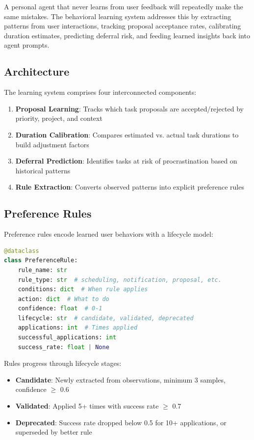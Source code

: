 \documentclass[11pt,a4paper]{article}
\begin{document}
A personal agent that never learns from user feedback will repeatedly make the same mistakes. The behavioral learning system addresses this by extracting patterns from user interactions, tracking proposal acceptance rates, calibrating duration estimates, predicting deferral risk, and feeding learned insights back into agent prompts.

\subsection{Architecture}

The learning system comprises four interconnected components:

\begin{enumerate}
    \item \textbf{Proposal Learning}: Tracks which task proposals are accepted/rejected by priority, project, and context
    \item \textbf{Duration Calibration}: Compares estimated vs. actual task durations to build adjustment factors
    \item \textbf{Deferral Prediction}: Identifies tasks at risk of procrastination based on historical patterns
    \item \textbf{Rule Extraction}: Converts observed patterns into explicit preference rules
\end{enumerate}

\subsection{Preference Rules}

Preference rules encode learned user behaviors with a lifecycle model:

\begin{lstlisting}[language=Python]
@dataclass
class PreferenceRule:
    rule_name: str
    rule_type: str  # scheduling, notification, proposal, etc.
    conditions: dict  # When rule applies
    action: dict  # What to do
    confidence: float  # 0-1
    lifecycle: str  # candidate, validated, deprecated
    applications: int  # Times applied
    successful_applications: int
    success_rate: float | None
\end{lstlisting}

Rules progress through lifecycle stages:
\begin{itemize}
    \item \textbf{Candidate}: Newly extracted from observations, minimum 3 samples, confidence $\geq$ 0.6
    \item \textbf{Validated}: Applied 5+ times with success rate $\geq$ 0.7
    \item \textbf{Deprecated}: Success rate dropped below 0.5 for 10+ applications, or superseded by better rule
\end{itemize}
\end{document}
